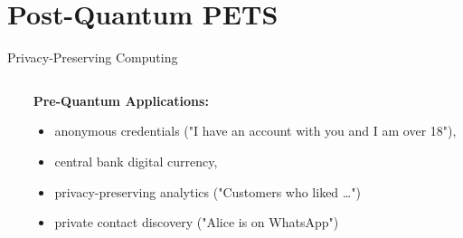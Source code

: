 \documentclass[xcolor=table,10pt,aspectratio=169]{beamer}
\begin{document}
\section{Post-Quantum PETS}
\label{sec:orgaebde68}
\begin{frame}[label={sec:org3e93747},fragile]{Privacy-Preserving Computing}
\begin{columns}
\begin{column}{0.6\columnwidth}
\newcommand{\mfi}[1]{\fbox{\texttt{[image: \#1]}}}
\setlength{\fboxsep}{0pt}
\end{column}

\begin{column}{0.4\columnwidth}
\textbf{Pre-Quantum Applications:}
\begin{itemize}
\item anonymous credentials ("I have an account with you and I am over 18"),
\item central bank digital currency,
\item privacy-preserving analytics ("Customers who liked …")
\item private contact discovery ("Alice is on WhatsApp")
\end{itemize}
\end{column}
\end{columns}
\end{frame}
\end{document}
